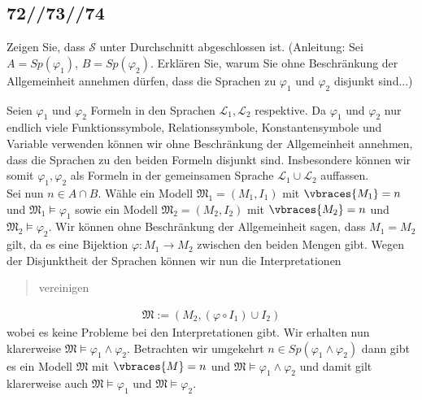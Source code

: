 \subsection*{72//73//74}

\begin{exercise}[72]

\phantom{}
	Zeigen Sie, dass $\mathscr{S}$ unter Durchschnitt abgeschlossen ist. (Anleitung: Sei $A = Sp(\varphi_1)$, $B = Sp(\varphi_2)$. Erklären Sie, warum Sie ohne Beschränkung der Allgemeinheit annehmen dürfen, dass die Sprachen zu $\varphi_1$ und $\varphi_2$ disjunkt sind...)

\end{exercise}


\begin{solution}

\phantom{}
	Seien $\varphi_1$ und $\varphi_2$ Formeln in den Sprachen $\mathcal{L}_1, \mathcal{L}_2$
	respektive.
	Da $\varphi_1$ und $\varphi_2$ nur endlich viele Funktionssymbole, Relationssymbole,
	Konstantensymbole und Variable verwenden können wir ohne Beschränkung der Allgemeinheit
	annehmen, dass die Sprachen zu den beiden Formeln disjunkt sind.\newline
	Insbesondere können wir somit $\varphi_1,\varphi_2$ als Formeln in der gemeinsamen Sprache
	$\mathcal{L}_1 \cup \mathcal{L}_2$ auffassen. \\
	Sei nun $n \in A \cap B$. Wähle ein Modell $\mathfrak{M}_1 = (M_1,I_1)$ mit
	$\vbraces{M_1} = n$ und $\mathfrak{M}_1 \vDash \varphi_1$ sowie ein Modell
	$\mathfrak{M}_2 = (M_2,I_2)$
	mit $\vbraces{M_2} = n$ und $\mathfrak{M}_2 \vDash \varphi_2$.
	Wir können ohne Beschränkung der Allgemeinheit sagen, dass $M_1 = M_2$ gilt,
	da es eine Bijektion $\varphi: M_1 \to M_2$ zwischen den beiden Mengen gibt.
	Wegen der Disjunktheit der Sprachen können wir nun die Interpretationen \blockquote{vereinigen}:
	\begin{align*}
	\mathfrak{M} := (M_2, (\varphi\circ I_1) \cup I_2)
	\end{align*}
	wobei es keine Probleme bei den Interpretationen gibt. Wir erhalten nun klarerweise $\mathfrak{M} \vDash \varphi_1 \land \varphi_2$.  \newline
	Betrachten wir umgekehrt $n \in Sp(\varphi_1 \land \varphi_2)$ dann gibt es ein Modell $\mathfrak{M}$ mit $\vbraces{M} = n$ und $\mathfrak{M} \vDash \varphi_1 \land \varphi_2$ und damit gilt klarerweise auch $\mathfrak{M} \vDash \varphi_1$ und $\mathfrak{M} \vDash \varphi_2$.
\end{solution}

